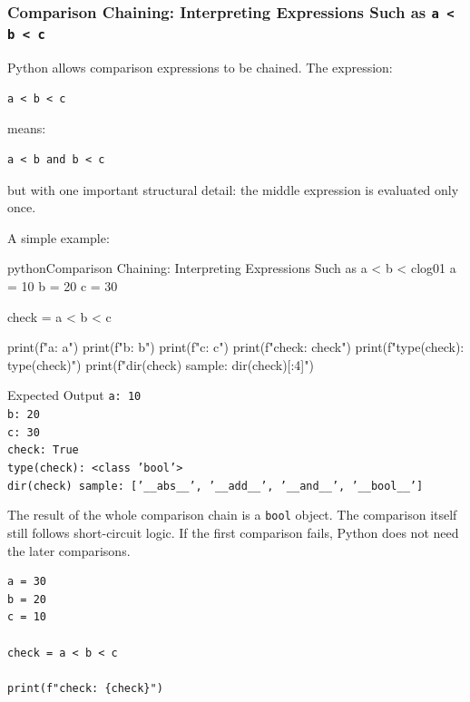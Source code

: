 \documentclass[a4paper,twoside]{report}
\begin{document}
\subsubsection{Comparison Chaining: Interpreting Expressions Such as \texttt{a < b < c}}

Python allows comparison expressions to be chained. The expression:

\begin{verbatim}
a < b < c
\end{verbatim}

means:

\begin{verbatim}
a < b and b < c
\end{verbatim}

but with one important structural detail: the middle expression is evaluated only once.

A simple example:

\begin{codebox}[]{python}{Comparison Chaining: Interpreting Expressions Such as a < b < c}{log01}
a = 10
b = 20
c = 30

check = a < b < c

print(f"a: {a}")
print(f"b: {b}")
print(f"c: {c}")
print(f"check: {check}")
print(f"type(check): {type(check)}")
print(f"dir(check) sample: {dir(check)[:4]}")
\end{codebox}


\begin{iobox}{Expected Output}
\texttt{a: 10} \\
\texttt{b: 20} \\
\texttt{c: 30} \\
\texttt{check: True} \\
\texttt{type(check): <class 'bool'>} \\
\texttt{dir(check) sample: ['\_\_abs\_\_', '\_\_add\_\_', '\_\_and\_\_', '\_\_bool\_\_']} \\
\end{iobox}


The result of the whole comparison chain is a \texttt{bool} object. The comparison itself still follows short-circuit logic. If the first comparison fails, Python does not need the later comparisons.

\begin{verbatim}
a = 30
b = 20
c = 10

check = a < b < c

print(f"check: {check}")
\end{verbatim}
\end{document}
